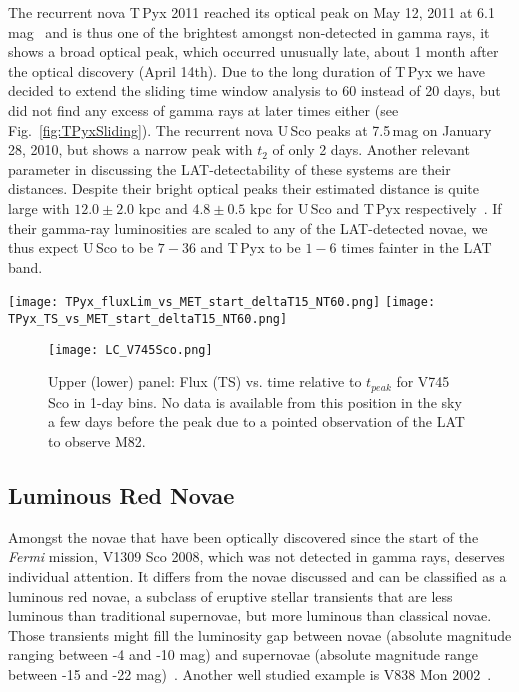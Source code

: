 \documentclass{aa} %
\begin{document}
The recurrent nova T\,Pyx 2011 reached its optical peak on May 12, 2011 at 6.1\,mag~\citep[see][]{cho14} and is thus one of the brightest amongst non-detected in gamma rays, it shows a broad optical peak, which occurred unusually late, about 1 month after the optical discovery (April 14th). Due to the long duration of T\,Pyx we have decided to extend the sliding time window analysis to 60 instead of 20 days, but did not find any excess of gamma rays at later times either (see Fig.~\ref{fig:TPyxSliding}). The recurrent nova U\,Sco peaks at 7.5\,mag on January 28, 2010, but shows a narrow peak with $t_2$ of only 2 days. Another relevant parameter in discussing the LAT-detectability of these systems are their distances. Despite their bright optical peaks their estimated distance is quite large with $12.0\pm2.0$ kpc  and $4.8\pm0.5$ kpc for U\,Sco and T\,Pyx respectively~\citep{Schaefer2010,2013ApJ...770L..33S}. If their gamma-ray luminosities are scaled to any of the LAT-detected novae, we thus expect U\,Sco to be $7-36$ and T\,Pyx to be $1-6$ times fainter in the LAT band.


\begin{figure*}[htb!]
\begin{center}
\texttt{[image: TPyx\_fluxLim\_vs\_MET\_start\_deltaT15\_NT60.png]}
\texttt{[image: TPyx\_TS\_vs\_MET\_start\_deltaT15\_NT60.png]}
\noindent
\caption{\small Sliding time window results for T\,Pyx extended to 60 days. The left panel shows the TS value for each tested time window, while the right panel shows the measured flux above 100\,MeV (TS$>4$, red) or 95\% flux upper limits (blue).}
\label{fig:TPyxSliding}
\end{center}
\end{figure*}

\begin{figure}[htb!]
\begin{center}
\texttt{[image: LC\_V745Sco.png]}
\noindent
\caption{\small Upper (lower) panel: Flux (TS) vs. time relative to $t_{peak}$ for V745\,Sco in 1-day bins. No data is available from this position in the sky a few days before the peak due to a pointed observation of the LAT to observe M82.}
\label{fig:LCV745Sco}
\end{center}
\end{figure}


\subsection{Luminous Red Novae}
\label{subsec:LRN}
Amongst the novae that have been optically discovered since the start of the \textit{Fermi} mission, V1309 Sco 2008, which was not detected in gamma rays, deserves individual attention. It differs from the novae discussed and can be classified as a luminous red novae, a subclass of eruptive stellar transients that are less luminous than traditional supernovae, but more luminous than classical novae. Those transients might fill the luminosity gap between novae (absolute magnitude ranging  between -4 and -10 mag) and supernovae (absolute magnitude range between -15 and -22 mag)~\citep{2013IAUS..281....9K}. Another well studied example is V838 Mon 2002~\citep{2002A&A...389L..51M}.
\end{document}
